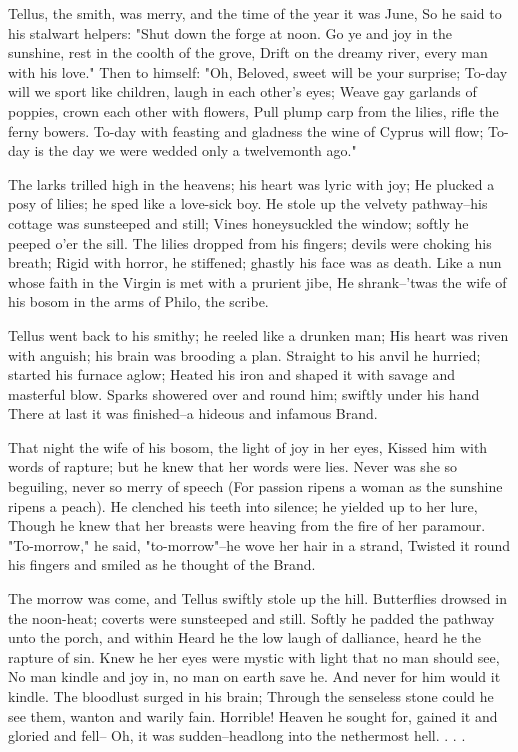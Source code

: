 \begin{poemblock}
 Tellus, the smith, was merry, and the time of the year it was June,
 So he said to his stalwart helpers:  "Shut down the forge at noon.
 Go ye and joy in the sunshine, rest in the coolth of the grove,
 Drift on the dreamy river, every man with his love."
 Then to himself:  "Oh, Beloved, sweet will be your surprise;
 To-day will we sport like children, laugh in each other's eyes;
 Weave gay garlands of poppies, crown each other with flowers,
 Pull plump carp from the lilies, rifle the ferny bowers.
 To-day with feasting and gladness the wine of Cyprus will flow;
 To-day is the day we were wedded only a twelvemonth ago."

 The larks trilled high in the heavens; his heart was lyric with joy;
 He plucked a posy of lilies; he sped like a love-sick boy.
 He stole up the velvety pathway--his cottage was sunsteeped and still;
 Vines honeysuckled the window; softly he peeped o'er the sill.
 The lilies dropped from his fingers; devils were choking his breath;
 Rigid with horror, he stiffened; ghastly his face was as death.
 Like a nun whose faith in the Virgin is met with a prurient jibe,
 He shrank--'twas the wife of his bosom in the arms of Philo, the scribe.

 Tellus went back to his smithy; he reeled like a drunken man;
 His heart was riven with anguish; his brain was brooding a plan.
 Straight to his anvil he hurried; started his furnace aglow;
 Heated his iron and shaped it with savage and masterful blow.
 Sparks showered over and round him; swiftly under his hand
 There at last it was finished--a hideous and infamous Brand.

 That night the wife of his bosom, the light of joy in her eyes,
 Kissed him with words of rapture; but he knew that her words were lies.
 Never was she so beguiling, never so merry of speech
 (For passion ripens a woman as the sunshine ripens a peach).
 He clenched his teeth into silence; he yielded up to her lure,
 Though he knew that her breasts were heaving from the fire of her paramour.
 "To-morrow," he said, "to-morrow"--he wove her hair in a strand,
 Twisted it round his fingers and smiled as he thought of the Brand.

 The morrow was come, and Tellus swiftly stole up the hill.
 Butterflies drowsed in the noon-heat; coverts were sunsteeped and still.
 Softly he padded the pathway unto the porch, and within
 Heard he the low laugh of dalliance, heard he the rapture of sin.
 Knew he her eyes were mystic with light that no man should see,
 No man kindle and joy in, no man on earth save he.
 And never for him would it kindle.  The bloodlust surged in his brain;
 Through the senseless stone could he see them, wanton and warily fain.
 Horrible!  Heaven he sought for, gained it and gloried and fell--
 Oh, it was sudden--headlong into the nethermost hell. . . .


\end{poemblock}
